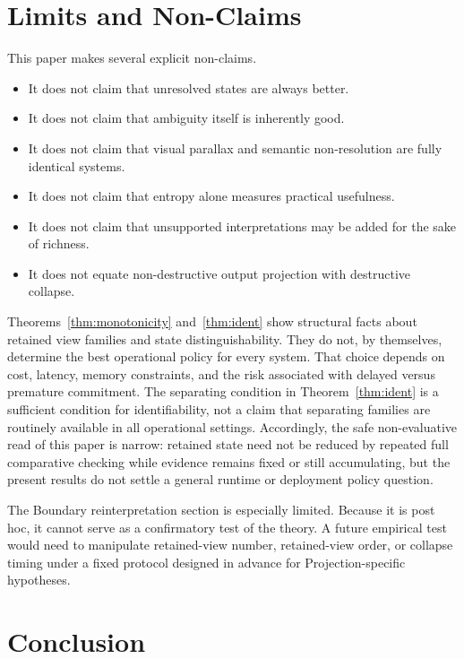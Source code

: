 \documentclass[11pt,a4paper]{article}
\begin{document}
\section{Limits and Non-Claims}
\label{sec:limits}

This paper makes several explicit non-claims.

\begin{itemize}
  \item It does not claim that unresolved states are always better.
  \item It does not claim that ambiguity itself is inherently good.
  \item It does not claim that visual parallax and semantic non-resolution are fully identical systems.
  \item It does not claim that entropy alone measures practical usefulness.
  \item It does not claim that unsupported interpretations may be added for the sake of richness.
  \item It does not equate non-destructive output projection with destructive collapse.
\end{itemize}

Theorems~\ref{thm:monotonicity} and~\ref{thm:ident} show structural facts about retained view families and state distinguishability. They do not, by themselves, determine the best operational policy for every system. That choice depends on cost, latency, memory constraints, and the risk associated with delayed versus premature commitment.
The separating condition in Theorem~\ref{thm:ident} is a sufficient condition for identifiability, not a claim that separating families are routinely available in all operational settings.
Accordingly, the safe non-evaluative read of this paper is narrow: retained state need not be reduced by repeated full comparative checking while evidence remains fixed or still accumulating, but the present results do not settle a general runtime or deployment policy question.

The Boundary reinterpretation section is especially limited. Because it is post hoc, it cannot serve as a confirmatory test of the theory. A future empirical test would need to manipulate retained-view number, retained-view order, or collapse timing under a fixed protocol designed in advance for Projection-specific hypotheses.

\section{Conclusion}
\label{sec:conclusion}
\end{document}
